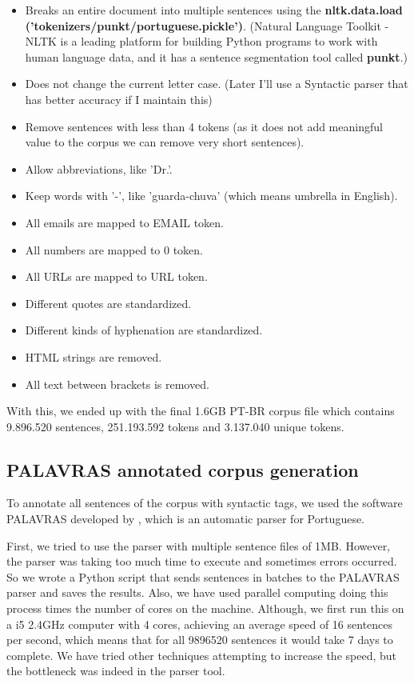 \begin{itemize}
    \item Breaks an entire document into multiple sentences using the 
    \textbf{nltk.data.load ('tokenizers/punkt/portuguese.pickle')}. (Natural Language Toolkit - NLTK is a leading platform for building Python programs to work with human language data, and it has a sentence segmentation tool called \textbf{punkt}.)
    \item Does not change the current letter case. (Later I'll use a Syntactic parser that has better accuracy if I maintain this)
    \item Remove sentences with less than 4 tokens (as it does not add meaningful value to the corpus we can remove very short sentences).
    \item Allow abbreviations, like 'Dr.'.
    \item Keep words with '-', like 'guarda-chuva' (which means umbrella in English).
    \item All emails are mapped to EMAIL token.
    \item All numbers are mapped to 0 token.
    \item All URLs are mapped to URL token.
    \item Different quotes are standardized.
    \item Different kinds of hyphenation are standardized.
    \item HTML strings are removed.
    \item All text between brackets is removed.
\end{itemize}

With this, we ended up with the final 1.6GB PT-BR corpus file which contains 9.896.520 sentences, 251.193.592 tokens and 3.137.040 unique tokens.

\subsection{PALAVRAS annotated corpus generation}

To annotate all sentences of the corpus with syntactic tags, we used the software PALAVRAS developed by , which is an automatic parser for Portuguese.

First, we tried to use the parser with multiple sentence files of 1MB. However, the parser was taking too much time to execute and sometimes errors occurred. So we wrote a Python script that sends sentences in batches to the PALAVRAS parser and saves the results. Also, we have used parallel computing doing this process times the number of cores on the machine. Although, we first run this on a i5 2.4GHz computer with 4 cores, achieving an average speed of 16 sentences per second, which means that for all 9896520 sentences it would take 7 days to complete. We have tried other techniques attempting to increase the speed, but the bottleneck was indeed in the parser tool. 


